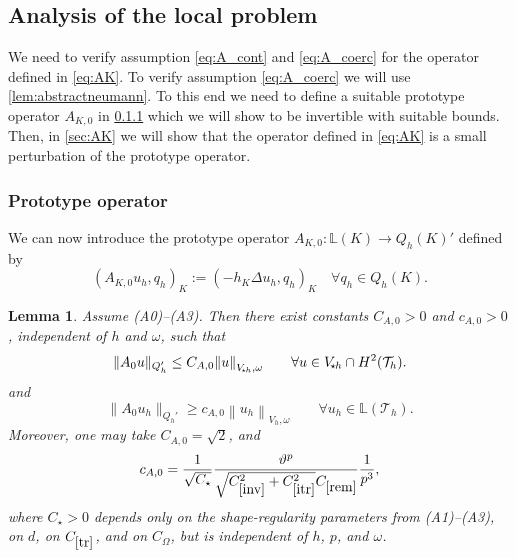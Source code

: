 \documentclass[11pt]{article}
\theoremstyle{definition}
\theoremstyle{plain}
\newtheorem{lemma}[theorem]{Lemma}
\newcommand{\const}[1]{C_{\eqref{#1}}}
\newcommand{\Vsh}{V_{\!\star \hspace*{-0.2mm}h}}
\newcommand{\dgonorm}[1]{\norm{#1}_{V_h,\omega}}
\newcommand{\tdgonorm}[1]{{\Vert#1\Vert}_{\Vsh,\omega}}
\newcommand{\Th}{{\calT_h}}
\newcommand{\Lh}{\mathbb{L}(\Th)}
\newcommand{\LKh}{\mathbb{L}(K)}
\newcommand{\QKh}{Q_h(K)}
\newcommand{\Qh}{Q_h}
\newcommand{\inner}[1]{( #1 )}
\newcommand*{\norm}[1]{\left\|#1\right\|}
\newcommand{\calT}{\mathcal{T}}
\begin{document}
\subsection{Analysis of the local problem}\label{sec:local_analysis}

We need to verify assumption \eqref{eq:A_cont} and \eqref{eq:A_coerc} for the operator defined in \eqref{eq:AK}.
To verify assumption \eqref{eq:A_coerc} we will use \cref{lem:abstractneumann}.
To this end we need to define a suitable prototype operator $A_{K,0}$ in \cref{sec:prototype} which we will show to be invertible with suitable bounds.
Then, in \cref{sec:AK} we will show that the operator defined in \eqref{eq:AK} is a small perturbation of the prototype operator.

\subsubsection{Prototype operator}\label{sec:prototype}
We can now introduce the prototype operator $A_{K,0}:\LKh \to \QKh'$ defined by
\begin{equation}\label{eq:AK0}
    \inner{A_{K,0} u_h, q_h}_K := \inner{-h_K\Delta u_h, q_h}_{K} \quad \forall q_h\in \QKh.
\end{equation}

\begin{lemma}\label{lem:nonharmonicNE}
Assume \textup{(A0)}--\textup{(A3)}.
Then there exist constants $C_{A,0}>0$ and $c_{A,0}>0$, independent of $h$ and $\omega$, such that
\begin{equation}\label{eq:AK0_scaled_bounds}
\|A_0 u\|_{\Qh'} \le C_{A,0}\tdgonorm{u}
\qquad\forall u\in \Vsh \cap H^2(\Th).
\end{equation}
and
\begin{equation}\label{eq:AK0_scaled_coerc}
\|A_0 u_h\|_{\Qh'} \ge c_{A,0}\dgonorm{u_h}
\qquad\forall u_h\in \Lh.
\end{equation}
Moreover, one may take $C_{A,0}=\sqrt 2$, and
\[
c_{A,0}
=
\frac{1}{\sqrt{C_\star}}
\frac{\vartheta^{p}}{\sqrt{\const{inv}^2+\const{itr}^2}\const{rem}}
\frac{1}{p^{3}},
\]
where $C_\star>0$ depends only on the shape-regularity parameters from \textup{(A1)}--\textup{(A3)}, on $d$,
on $\const{tr}$, and on $C_\Omega$, but is independent of $h$, $p$, and $\omega$.
\end{lemma}
\end{document}
